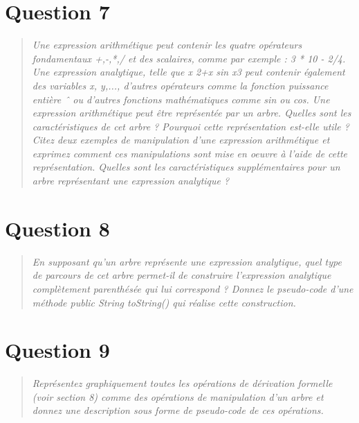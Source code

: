 \documentclass[11pt,a4paper]{article}
\begin{document}








\section{Question 7}
\begin{quotation}
\color{gray}\textit{Une expression arithmétique peut contenir les quatre opérateurs fondamentaux
+,-,*,/ et des scalaires, comme par exemple : 3 * 10 - 2/4. Une expression
analytique, telle que x
2+x sin x3 peut contenir également des variables x, y,...,
d’autres opérateurs comme la fonction puissance entière ˆ ou d’autres fonctions
mathématiques comme sin ou cos.
Une expression arithmétique peut être représentée par un arbre. Quelles sont les
caractéristiques de cet arbre ? Pourquoi cette représentation est-elle utile ? Citez
deux exemples de manipulation d’une expression arithmétique et exprimez comment ces manipulations sont mise en oeuvre à l’aide de cette représentation.
Quelles sont les caractéristiques supplémentaires pour un arbre représentant une
expression analytique ?}
\end{quotation}

\section{Question 8}
\begin{quotation}
\color{gray}\textit{En supposant qu’un arbre représente une expression analytique, quel type de parcours de cet arbre permet-il de construire l’expression analytique complètement
parenthésée qui lui correspond ? Donnez le pseudo-code d’une méthode public
String toString() qui réalise cette construction.}
\end{quotation}

\section{Question 9}
\begin{quotation}
\color{gray}\textit{Représentez graphiquement toutes les opérations de dérivation formelle (voir section 8) comme des opérations de manipulation d’un arbre et donnez une description sous forme de pseudo-code de ces opérations.}
\end{quotation}
\end{document}
